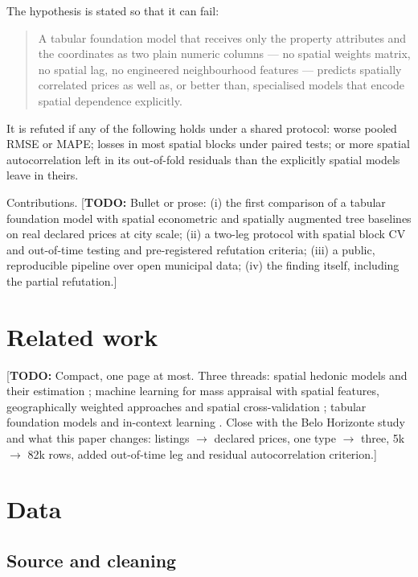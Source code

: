 \documentclass[11pt,a4paper]{article}
\newcommand{\todo}[1]{\textcolor{red!70!black}{[\textbf{TODO:} #1]}}
\begin{document}
The hypothesis is stated so that it can fail:

\begin{quote}
A tabular foundation model that receives only the property attributes and the coordinates as two
plain numeric columns --- no spatial weights matrix, no spatial lag, no engineered neighbourhood
features --- predicts spatially correlated prices as well as, or better than, specialised models
that encode spatial dependence explicitly.
\end{quote}

It is refuted if any of the following holds under a shared protocol: worse pooled RMSE or MAPE;
losses in most spatial blocks under paired tests; or more spatial autocorrelation left in its
out-of-fold residuals than the explicitly spatial models leave in theirs.

Contributions. \todo{Bullet or prose: (i) the first comparison of a tabular foundation model with
spatial econometric and spatially augmented tree baselines on real declared prices at city scale;
(ii) a two-leg protocol with spatial block CV and out-of-time testing and pre-registered refutation
criteria; (iii) a public, reproducible pipeline over open municipal data; (iv) the finding itself,
including the partial refutation.}

\section{Related work}
\label{sec:related}

\todo{Compact, one page at most. Three threads: spatial hedonic models and their estimation
\citep{anselin1988,kelejian1998,lesage2009}; machine learning for mass appraisal with spatial
features, geographically weighted approaches and spatial cross-validation
\citep{roberts2017,meyer2022}; tabular foundation models and in-context learning
\citep{hollmann2023tabpfn,hollmann2025nature,priorlabs2026tabpfn3}. Close with the Belo Horizonte
study \citep{benvenho2026cead} and what this paper changes: listings $\to$ declared prices, one
type $\to$ three, 5k $\to$ 82k rows, added out-of-time leg and residual autocorrelation criterion.}

\section{Data}
\label{sec:data}

\subsection{Source and cleaning}
\end{document}
